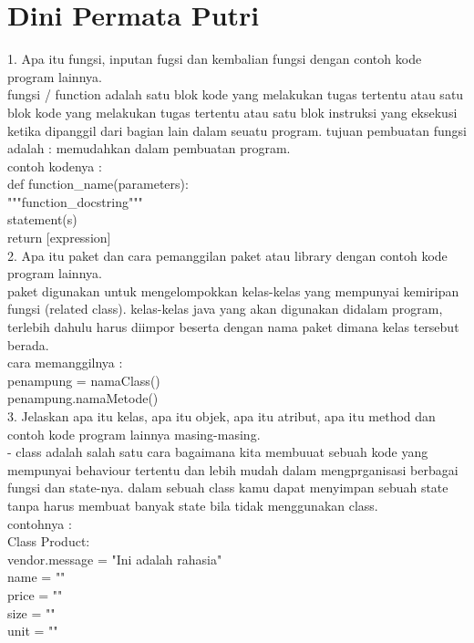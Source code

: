\section{Dini Permata Putri}


1. Apa itu fungsi, inputan fugsi dan kembalian fungsi dengan contoh kode program lainnya.\\
fungsi / function adalah satu blok kode yang melakukan tugas tertentu atau satu blok kode yang melakukan tugas tertentu atau satu blok instruksi yang eksekusi ketika dipanggil dari bagian lain dalam seuatu program. tujuan pembuatan fungsi adalah : memudahkan dalam pembuatan program.\\
contoh kodenya :\\
def function\_name(parameters):\\
	"""function\_docstring"""\\
	statement(s)\\
	return [expression]\\
	
2. Apa itu paket dan cara pemanggilan paket atau library dengan contoh kode program lainnya.\\
paket digunakan untuk mengelompokkan kelas-kelas yang mempunyai kemiripan fungsi (related class). kelas-kelas java yang akan digunakan didalam program, terlebih dahulu harus diimpor beserta dengan nama paket dimana kelas tersebut berada.\\
cara memanggilnya :\\
penampung = namaClass()\\
penampung.namaMetode()\\

3. Jelaskan apa itu kelas, apa itu objek, apa itu atribut, apa itu method dan contoh kode program lainnya masing-masing.\\
- class adalah salah satu cara bagaimana kita membuuat sebuah kode yang mempunyai behaviour tertentu dan lebih mudah dalam mengprganisasi berbagai fungsi dan state-nya. dalam sebuah class kamu dapat menyimpan sebuah state tanpa harus membuat banyak state bila tidak menggunakan class.\\
contohnya : \\
Class Product:\\
	vendor.message = "Ini adalah rahasia"\\
	name = ""\\
	price = ""\\
	size = ""\\
	unit = ""\\
	
